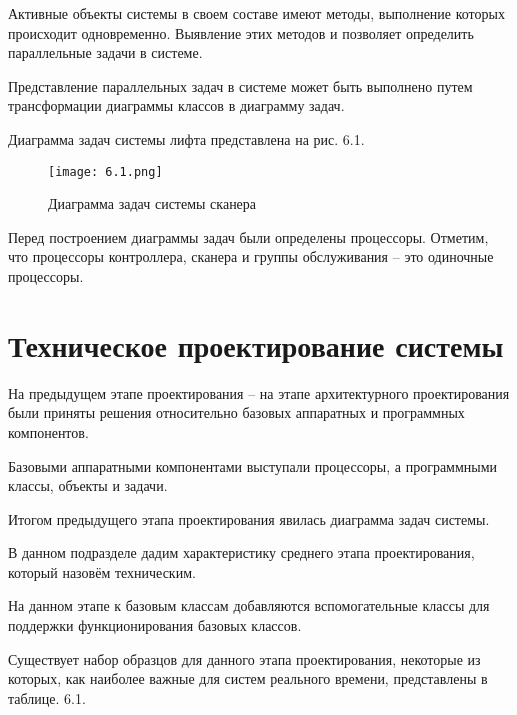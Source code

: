 \documentclass[12pt]{article}
\let\oldsection\section
\renewcommand{\section}[1]{
    \oldsection{#1}
    \setcounter{table}{0}
    \setcounter{figure}{0}
}
\begin{document}
    Активные объекты системы в своем составе имеют методы, выполнение
    которых происходит одновременно. Выявление этих методов и позволяет
    определить параллельные задачи в системе.

    Представление параллельных задач в системе может быть выполнено
    путем трансформации диаграммы классов в диаграмму задач.

    Диаграмма задач системы лифта представлена на рис. 6.1.

    \begin{figure}[h]
        \texttt{[image: 6.1.png]}
        \centering
        \caption{Диаграмма задач системы сканера}
    \end{figure}

    Перед построением диаграммы задач были определены процессоры. Отметим, что процессоры контроллера, сканера и группы обслуживания – это одиночные процессоры.

    \newpage

    \section{Техническое проектирование системы}

    На предыдущем этапе проектирования – на этапе архитектурного проектирования были приняты решения относительно базовых аппаратных и программных компонентов.

    Базовыми аппаратными компонентами выступали процессоры, а программными классы, объекты и задачи.

    Итогом предыдущего этапа проектирования явилась диаграмма задач системы.

    В данном подразделе дадим характеристику среднего этапа проектирования, который назовём техническим.

    На данном этапе к базовым классам добавляются вспомогательные классы для поддержки функционирования базовых классов.

    Существует набор образцов для данного этапа проектирования, некоторые из которых, как наиболее важные для систем реального времени, представлены в таблице. 6.1.
\end{document}
